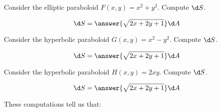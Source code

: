 \documentclass{ximera}
\author{}
\begin{document}
\begin{exercise}
  Consider the elliptic paraboloid $F(x,y) = x^2 + y^2$. Compute $\d
  S$.
  \begin{prompt}
    \[
    \d S = \answer{\sqrt{2x + 2y + 1}} \d A
    \]
  \end{prompt}
  \begin{exercise}
  Consider the hyperbolic paraboloid $G(x,y) = x^2 - y^2$. Compute $\d
  S$.
  \begin{prompt}
    \[
    \d S = \answer{\sqrt{2x + 2y + 1}} \d A
    \]
  \end{prompt}
  \begin{exercise}
  Consider the hyperbolic paraboloid $H(x,y) = 2xy$. Compute $\d
  S$.
  \begin{prompt}
    \[
    \d S = \answer{\sqrt{2x + 2y + 1}} \d A
    \]
  \end{prompt}
  \begin{exercise}
    These computations tell us that:
    \begin{multipleChoice}


    \end{multipleChoice}
  \end{exercise}
  \end{exercise}
  \end{exercise}
\end{exercise}
\end{document}
